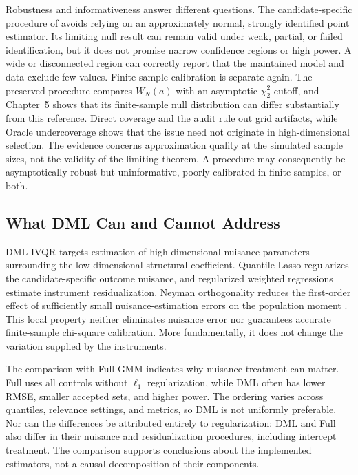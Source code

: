 Robustness and informativeness answer different questions. The candidate-specific procedure of \textcite{chernozhukov_hansen_2008} avoids relying on an approximately normal, strongly identified point estimator. Its limiting null result can remain valid under weak, partial, or failed identification, but it does not promise narrow confidence regions or high power. A wide or disconnected region can correctly report that the maintained model and data exclude few values. Finite-sample calibration is separate again. The preserved procedure compares $W_N(a)$ with an asymptotic $\chi^2_2$ cutoff, and Chapter~5 shows that its finite-sample null distribution can differ substantially from this reference. Direct coverage and the audit rule out grid artifacts, while Oracle undercoverage shows that the issue need not originate in high-dimensional selection. The evidence concerns approximation quality at the simulated sample sizes, not the validity of the limiting theorem. A procedure may consequently be asymptotically robust but uninformative, poorly calibrated in finite samples, or both.

\subsection{What DML Can and Cannot Address}

DML-IVQR targets estimation of high-dimensional nuisance parameters surrounding the low-dimensional structural coefficient. Quantile Lasso regularizes the candidate-specific outcome nuisance, and regularized weighted regressions estimate instrument residualization. Neyman orthogonality reduces the first-order effect of sufficiently small nuisance-estimation errors on the population moment \parencite{chernozhukov_et_al_2018,chen_huang_tien_2021}. This local property neither eliminates nuisance error nor guarantees accurate finite-sample chi-square calibration. More fundamentally, it does not change the variation supplied by the instruments.

The comparison with Full-GMM indicates why nuisance treatment can matter. Full uses all controls without $\ell_1$ regularization, while DML often has lower RMSE, smaller accepted sets, and higher power. The ordering varies across quantiles, relevance settings, and metrics, so DML is not uniformly preferable. Nor can the differences be attributed entirely to regularization: DML and Full also differ in their nuisance and residualization procedures, including intercept treatment. The comparison supports conclusions about the implemented estimators, not a causal decomposition of their components.

